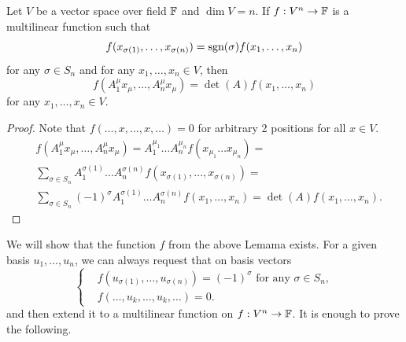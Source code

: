 \documentclass[main.tex]{subfiles}
\begin{document}
\begin{lemma}
\label{alternative-determinant-def}
Let $V$ be a vector space over field $\mathbb{F}$ and $\dim V = n$. If $f:V^n\to \mathbb{F}$ is a multilinear function such that
\begin{equation}
f(x_{\sigma(1)},\ldots, x_{\sigma(n)}) = \text{sgn}(\sigma)f(x_1,\ldots, x_n)
\end{equation}
for any $\sigma\in S_n$ and for any $x_1, \dots, x_n\in V$, then
\begin{equation}
f(A^\mu_1 x_\mu, \dots, A^\mu_n x_\mu) = \det(A) f(x_1, \dots, x_n)  
\end{equation}
for any $x_1, \dots, x_n\in V$.
\end{lemma}
\begin{proof}
Note that $f(\dots, x, \dots, x, \dots) = 0$ for arbitrary 2 positions for all $x\in V$.
\begin{align*}
& f(A^\mu_1 x_\mu, \dots, A^\mu_n x_\mu) = A^{\mu_1}_1 \dots A^{\mu_n}_n 
f(x_{\mu_1} \dots x_{\mu_n}) = \\
& \sum_{\sigma\in S_n}A^{\sigma(1)}_1 \dots A^{\sigma(n)}_n f(x_{\sigma(1)}, \dots, x_{\sigma(n)})= \\ & \sum_{\sigma\in S_n}(-1)^\sigma A^{\sigma(1)}_1 \dots A^{\sigma(n)}_n f(x_1, \dots, x_n) = \det(A) f(x_1, \dots, x_n).
\end{align*}
\end{proof}

We will show that the function $f$ from the above Lemama exists. For a given basis $u_1, \dots, u_n$, we can always request that on basis vectors
\begin{equation}
\begin{cases}
& f(u_{\sigma(1)},\dots,u_{\sigma(n)}) = (-1)^\sigma \text{ for any } \sigma\in S_n,\\
& f(\dots, u_k,\dots,u_k,\dots) = 0.
\end{cases}
\end{equation} 
and then extend it to a multilinear function on $f:V^n\to\mathbb{F}$. It is enough to prove the following.
\end{document}
